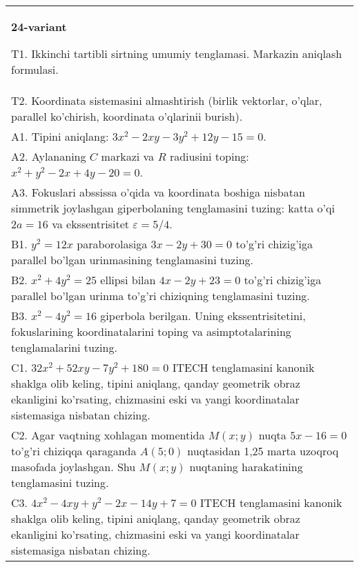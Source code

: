 \documentclass{article}
\begin{document}
\begin{tabular}{m{17cm}}
\textbf{24-variant}
\newline

T1. Ikkinchi tartibli sirtning umumiy tenglamasi. Markazin aniqlash formulasi.\\

T2. Koordinata sistemasini almashtirish (birlik vektorlar, o'qlar, parallel ko'chirish, koordinata o'qlarinii burish).\\

A1. Tipini aniqlang: $3x^{2}-2xy-3y^{2}+12y-15=0$.\\

A2. Aylananing $C$ markazi va $R$ radiusini toping: $x^2+y^2-2x+4y-20=0$.\\

A3. Fokuslari abssissa o'qida va koordinata boshiga nisbatan simmetrik joylashgan giperbolaning tenglamasini tuzing: katta o'qi $2a=16$ va ekssentrisitet $\varepsilon=5/4$.\\

B1. $y^{2} = 12x$ paraborolasiga $3x - 2y + 30 = 0$ to'g'ri chizig'iga parallel bo'lgan urinmasining tenglamasini tuzing.  \\

B2. $x^{2} + 4y^{2} = 25$ ellipsi bilan $4x - 2y + 23 = 0$ to'g'ri chizig'iga parallel bo'lgan urinma to'g'ri chiziqning tenglamasini tuzing.  \\

B3. $x^{2} - 4y^{2} = 16$ giperbola berilgan. Uning ekssentrisitetini, fokuslarining koordinatalarini toping va asimptotalarining tenglamalarini tuzing.\\

C1. $32x^{2} + 52xy - 7y^{2} + 180 = 0$ ITECH tenglamasini kanonik shaklga olib keling, tipini aniqlang, qanday geometrik obraz ekanligini ko'rsating, chizmasini eski va yangi koordinatalar sistemasiga nisbatan chizing.  \\

C2. Agar vaqtning xohlagan momentida $M(x;y)$ nuqta $5x - 16 = 0$ to'g'ri chiziqqa qaraganda $A(5;0)$ nuqtasidan 1,25 marta uzoqroq masofada joylashgan. Shu $M(x;y)$ nuqtaning harakatining tenglamasini tuzing.  \\

C3. $4x^{2} - 4xy + y^{2} - 2x - 14y + 7 = 0$ ITECH tenglamasini kanonik shaklga olib keling, tipini aniqlang, qanday geometrik obraz ekanligini ko'rsating, chizmasini eski va yangi koordinatalar sistemasiga nisbatan chizing.  \\

\end{tabular}
\vspace{1cm}
\end{document}
